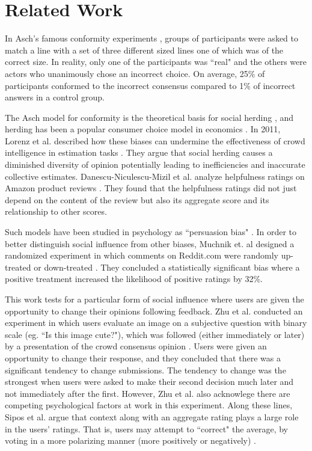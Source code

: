 \section{Related Work}
In Asch's famous conformity experiments \cite{asch1956studies, asch1955opinions, bond1996culture}, groups of participants were asked to match a line with a set of three different sized lines one of which was of the correct size.
In reality, only one of the participants was ``real" and the others were actors who unanimously chose an incorrect choice.
On average, 25\% of participants conformed to the incorrect consensus compared to 1\% of incorrect answers in a control group.

The Asch model for conformity is the theoretical basis for social herding \cite{banerjee1992simple,bikhchandani2000herd}, and herding has been a popular consumer choice model in economics \cite{burnkrant1975informational,dholakia2002auction,huang2006herding}. 
In 2011, Lorenz et al. described how these biases can undermine the effectiveness of crowd intelligence in estimation tasks \cite{lorenz2011social}. 
They argue that social herding causes a diminished diversity of opinion potentially leading to inefficiencies and inaccurate collective estimates.
Danescu-Niculescu-Mizil et al. analyze helpfulness ratings on Amazon product reviews \cite{danescu2009opinions}.
They found that the helpfulness ratings did not just depend on the content of the review but also its aggregate score and its relationship to other scores.

Such models have been studied in psychology as ``persuasion bias" \cite{demarzo2003persuasion}.
In order to better distinguish social influence from other biases, Muchnik et. al designed a randomized experiment in which comments on Reddit.com were randomly up-treated or down-treated \cite{muchnik2013social}.
They concluded a statistically significant bias where a positive treatment increased the likelihood of positive ratings by 32\%. 

This work tests for a particular form of social influence where users are given the opportunity to change their opinions following feedback. 
Zhu et al. conducted an experiment in which users evaluate an image on a subjective question with binary scale (eg. ``Is this image cute?"), which was followed (either immediately or later) by a presentation of the crowd consensus opinion \cite{zhu2012switch}. 
Users were given an opportunity to change their response, and they concluded that there was a significant tendency to change submissions.
The tendency to change was the strongest when users were asked to make their second decision much later and not immediately after the first.
However, Zhu et al. also acknowlege there are competing psychological factors at work in this experiment.
Along these lines, Sipos et al. argue that context along with an aggregate rating plays a large role in the users' ratings. That is, users may attempt to ``correct" the average, by voting in a more polarizing manner (more positively or negatively) \cite{siposreview}.




